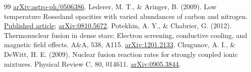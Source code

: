 \documentclass[11pt,letterpaper]{article}
\begin{document}
\begin{thebibliography}{99}
\href{https://arxiv.org/abs/astro-ph/0506386}{arXiv:astro-ph/0506386}.
 Lederer, M. T., \& Aringer, B. (2009).
Low temperature Rosseland opacities with varied abundances of carbon and nitrogen.
\href{https://doi.org/10.1051/0004-6361:200810576}{Published article};
\href{https://arxiv.org/abs/0810.5672}{arXiv:0810.5672}.
 Potekhin, A. Y., \& Chabrier, G. (2012).
Thermonuclear fusion in dense stars: Electron screening, conductive cooling,
and magnetic field effects. A\&A, 538, A115.
\href{https://arxiv.org/abs/1201.2133}{arXiv:1201.2133}.
 Chugunov, A. I., \& DeWitt, H. E. (2009).
Nuclear fusion reaction rates for strongly coupled ionic mixtures.
Physical Review C, 80, 014611.
\href{https://arxiv.org/abs/0905.3844}{arXiv:0905.3844}.
\end{thebibliography}

\end{document}
